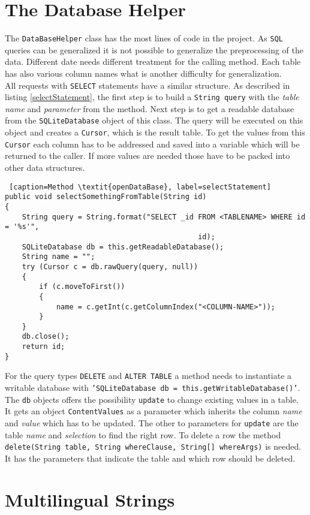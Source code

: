 \section{The Database Helper}

The \texttt{DataBaseHelper} class has the most lines of code in the project. As \texttt{SQL} queries can be generalized it is not possible to generalize the preprocessing of the data. Different date needs different treatment for the calling method. Each table has also various column names what is another difficulty for generalization. \\
All requests with \texttt{SELECT} statements have a similar structure. As described in listing \ref{selectStatement}, the first step is to build a \texttt{String query} with the \textit{table name} and \textit{parameter} from the method. Next step is to get a readable database from the \texttt{SQLiteDatabase} object of this class. The query will be executed on this object and creates a \texttt{Cursor}, which is the result table. To get the values from this \texttt{Cursor} each column has to be addressed and saved into a variable which will be returned to the caller. If more values are needed those have to be packed into other data structures.
\begin{lstlisting} [caption=Method \textit{openDataBase}, label=selectStatement] 
public void selectSomethingFromTable(String id)
{
	String query = String.format("SELECT _id FROM <TABLENAME> WHERE id = '%s'",
											 id);
	SQLiteDatabase db = this.getReadableDatabase();
	String name = "";
	try (Cursor c = db.rawQuery(query, null))
	{
		if (c.moveToFirst())
		{
			name = c.getInt(c.getColumnIndex("<COLUMN-NAME>"));
		}
	}
	db.close();
	return id;
}
\end{lstlisting}
For the query types \texttt{DELETE} and \texttt{ALTER TABLE} a method needs to instantiate a writable database with \texttt{'SQLiteDatabase db = this.getWritableDatabase()'}. The \texttt{db} objects offers the possibility \texttt{update} to change existing values in a table. It gets an object \texttt{ContentValues} as a parameter which inherits the column \textit{name} and \textit{value} which has to be updated. The other to parameters for \texttt{update} are the table \textit{name} and \textit{selection} to find the right row. To delete a row the method \texttt{delete(String table, String whereClause, String[] whereArgs)} is needed. It has the parameters that indicate the table and which row should be deleted.

\section{Multilingual Strings}

